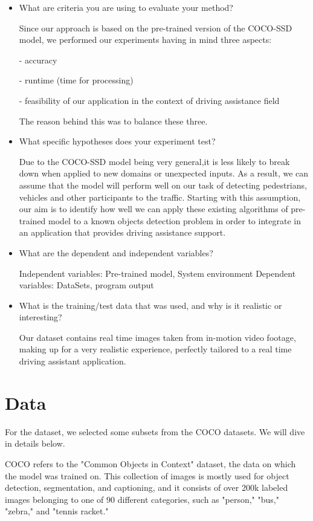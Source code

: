 \documentclass[runningheads,a4paper,11pt]{report}
\begin{document}
\begin{itemize}
	\item What are criteria you are using to evaluate your method? 
	
	Since our approach is based on the pre-trained version of the COCO-SSD model, we performed our experiments having in mind three aspects: 
	
    - accuracy
    
    - runtime (time for processing)
    
    - feasibility of our application in the context of driving assistance field
    
    The reason behind this was to balance these three.
	\item What specific hypotheses does your experiment test? 
	
	Due to the COCO-SSD model being very general,it is less likely to break down when applied to new domains or unexpected inputs. As a result, we can assume that the model will perform well on our task of detecting pedestrians, vehicles and other participants to the traffic. Starting with this assumption, our aim is to identify how well we can apply these existing algorithms of pre-trained model to a known objects detection problem in order to integrate in an application that provides driving assistance support.
	\item What are the dependent and independent variables? 
	
	Independent variables: Pre-trained model, System environment
	Dependent variables: DataSets, program output
	
	\item What is the training/test data that was used, and why is it realistic or interesting? 
	
	Our dataset contains real time images taken from in-motion video footage, making up for a very realistic experience, perfectly tailored to a real time driving assistant application.
	
\end{itemize}

\section{Data}
\label{section:data}

For the dataset, we selected some subsets from the COCO datasets. We will dive in details below.

COCO refers to the "Common Objects in Context" dataset, the data on which the model was trained on. This collection of images is mostly used for object detection, segmentation, and captioning, and it consists of over 200k labeled images belonging to one of 90 different categories, such as "person," "bus," "zebra," and "tennis racket."
\end{document}
